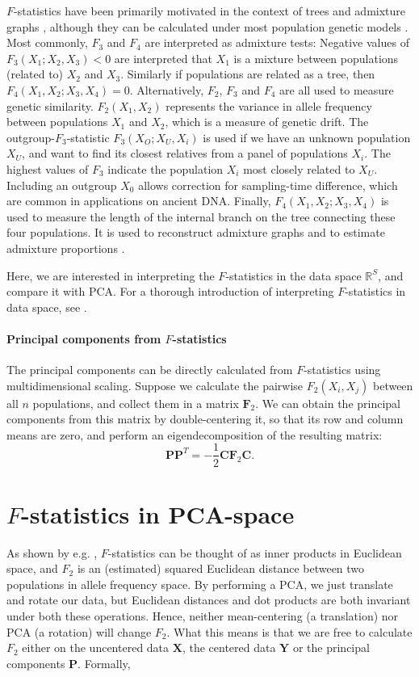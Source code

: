 \documentclass[12pt,a4pape, fullpage]{article}
\newcommand{\MX}{\mathbf{X}} %
\newcommand{\MC}{\mathbf{C}} %
\newcommand{\MY}{\mathbf{Y}} %
\newcommand{\MF}{\mathbf{F}_2} %
\newcommand{\MP}{\mathbf{P}} %
\begin{document}
$F$-statistics have been primarily motivated in the context of trees and admixture graphs \citep{patterson2012}, although they can be calculated under most population genetic models \citep{peter2016}. Most commonly, $F_3$ and $F_4$ are interpreted as admixture tests: Negative values of  $F_3(X_1; X_2, X_3) < 0$ are interpreted that $X_1$ is a mixture between populations (related to) $X_2$ and $X_3$. Similarly if populations are related as a tree, then $F_4(X_1, X_2; X_3, X_4) =0$. Alternatively, $F_2$, $F_3$ and $F_4$ are all used to measure genetic similarity. $F_2(X_1, X_2)$ represents the variance in allele frequency between populations $X_1$ and $X_2$, which is a measure of genetic drift. The outgroup-$F_3$-statistic $F_3(X_O; X_U, X_i)$ is used if we have an unknown population $X_U$, and want to find its closest relatives from a panel of populations $X_i$. The highest values of $F_3$ indicate the population $X_i$ most closely related to $X_U$. Including an outgroup $X_0$ allows correction for sampling-time difference, which are common in applications on ancient DNA. Finally, $F_4(X_1, X_2; X_3, X_4)$ is used to measure the length of the internal branch on the tree connecting these four populations. It is used to reconstruct admixture graphs \cite{patterson2012, lipson2013} and to estimate admixture proportions \citep{petr2019, harney2020}.

Here, we are interested in interpreting the $F$-statistics in the data space $\mathbb{R}^S$, and compare it with PCA. For a thorough introduction of interpreting $F$-statistics in data space, see \cite{oteo-garcia2021}.
	
\paragraph{Principal components from $F$-statistics}
The principal components can be directly calculated from $F$-statistics using multidimensional scaling. Suppose we calculate the pairwise $F_2(X_i, X_j)$ between all $n$ populations, and collect them in a matrix $\MF$. We can obtain the principal components from this matrix by double-centering it, so that its row and column means are zero, and perform an eigendecomposition of the resulting matrix:
\begin{equation}
\MP\MP^T = - \frac{1}{2}\MC\MF\MC \text{.} \label{eq:mds}
\end{equation}

\section{$F$-statistics in PCA-space}
As shown by e.g. \cite{oteo-garcia2021}, $F$-statistics can be thought of as inner products in Euclidean space, and $F_2$ is an (estimated) squared Euclidean distance between two populations in allele frequency space. By performing a PCA, we just translate and rotate our data, but Euclidean distances and dot products are both invariant under both these operations. Hence, neither mean-centering (a translation) nor PCA (a rotation) will change $F_2$. What this means is that we are free to calculate $F_2$ either on the uncentered data $\MX$, the centered data $\MY$ or the principal components $\MP$. Formally,
\end{document}
